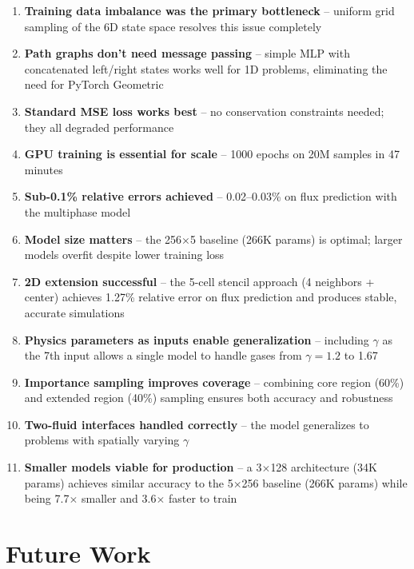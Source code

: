 \documentclass[11pt,a4paper]{article}
\begin{document}
\begin{enumerate}
    \item \textbf{Training data imbalance was the primary bottleneck} -- uniform grid sampling of the 6D state space resolves this issue completely
    \item \textbf{Path graphs don't need message passing} -- simple MLP with concatenated left/right states works well for 1D problems, eliminating the need for PyTorch Geometric
    \item \textbf{Standard MSE loss works best} -- no conservation constraints needed; they all degraded performance
    \item \textbf{GPU training is essential for scale} -- 1000 epochs on 20M samples in 47 minutes
    \item \textbf{Sub-0.1\% relative errors achieved} -- 0.02--0.03\% on flux prediction with the multiphase model
    \item \textbf{Model size matters} -- the 256$\times$5 baseline (266K params) is optimal; larger models overfit despite lower training loss
    \item \textbf{2D extension successful} -- the 5-cell stencil approach (4 neighbors + center) achieves 1.27\% relative error on flux prediction and produces stable, accurate simulations
    \item \textbf{Physics parameters as inputs enable generalization} -- including $\gamma$ as the 7th input allows a single model to handle gases from $\gamma = 1.2$ to 1.67
    \item \textbf{Importance sampling improves coverage} -- combining core region (60\%) and extended region (40\%) sampling ensures both accuracy and robustness
    \item \textbf{Two-fluid interfaces handled correctly} -- the model generalizes to problems with spatially varying $\gamma$
    \item \textbf{Smaller models viable for production} -- a 3$\times$128 architecture (34K params) achieves similar accuracy to the 5$\times$256 baseline (266K params) while being 7.7$\times$ smaller and 3.6$\times$ faster to train
\end{enumerate}

\section{Future Work}
\end{document}
